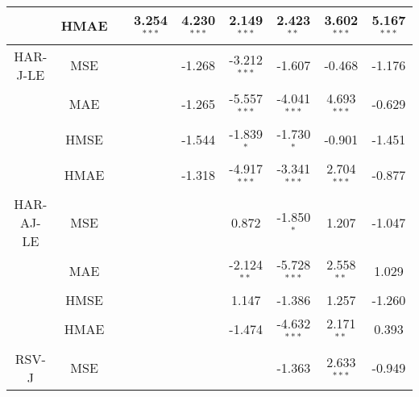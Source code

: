 \documentclass[10pt]{article}
\begin{document}
\begin{landscape}
\begin{center}
\begin{tabular}{c|c|ccccccc}
                        &  HMAE          &                    &3.254$^{\ast \ast \ast}$&4.230$^{\ast \ast \ast}$  &2.149$^{\ast \ast \ast}$&2.423$^{\ast \ast}$       &3.602$^{\ast \ast \ast}$&5.167$^{\ast \ast \ast}$            \\  \hline 
HAR-J-LE          &  MSE             &                    &                                 &-1.268                        &-3.212$^{\ast \ast \ast}$&-1.607                          &-0.468                        &-1.176            \\
                       &  MAE            &                    &                                 &-1.265                         &-5.557$^{\ast \ast \ast}$&-4.041$^{\ast \ast \ast}$&4.693$^{\ast \ast \ast}$&-0.629            \\
                       &  HMSE          &                    &                                 &-1.544                         &-1.839$^{\ast}$              &-1.730$^{ \ast}$             &-0.901                       &-1.451             \\
                       &  HMAE          &                    &                                 &-1.318                        &-4.917$^{\ast \ast \ast}$ &-3.341$^{\ast \ast \ast}$&2.704$^{\ast \ast \ast}$&-0.877            \\  \hline
HAR-AJ-LE      &  MSE            &                    &                                   &                                &0.872                            &-1.850$^{\ast}$               &1.207                        &-1.047             \\
                       &  MAE            &                    &                                 &                                 &-2.124$^{\ast \ast}$        &-5.728$^{\ast \ast \ast}$ &2.558$^{\ast \ast}$      &1.029             \\
                       &  HMSE          &                    &                                  &                                & 1.147                           &-1.386                           &1.257                         &-1.260             \\
                       &  HMAE          &                    &                                 &                                 &-1.474                           &-4.632$^{\ast \ast \ast}$ &2.171$^{\ast \ast}$      &0.393           \\  \hline 
RSV-J              &  MSE            &                    &                                 &                                 &                                   &-1.363                           &2.633$^{\ast \ast \ast}$&-0.949             \\

\end{tabular}
\end{center}
\end{landscape}
\end{document}

